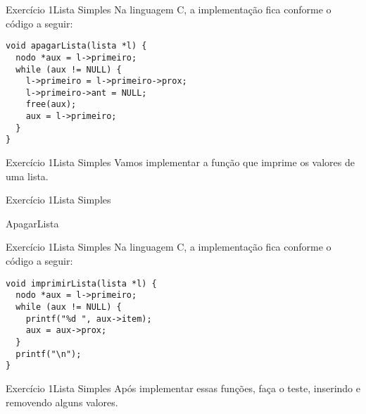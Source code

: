 \documentclass[aspectratio=169]{beamer}
\begin{document}
\begin{frame}[fragile]{Exercício 1}{Lista Simples}
Na linguagem C, a implementação fica conforme o código a seguir:
\begin{lstlisting}[style=CStyle]
void apagarLista(lista *l) {
  nodo *aux = l->primeiro;
  while (aux != NULL) {
    l->primeiro = l->primeiro->prox;
    l->primeiro->ant = NULL;
    free(aux);   
    aux = l->primeiro;
  }
}
\end{lstlisting}  
\end{frame}


\begin{frame}[fragile]{Exercício 1}{Lista Simples}
Vamos implementar a função que imprime os valores de uma lista.
\end{frame}


\begin{frame}[fragile]{Exercício 1}{Lista Simples}
\begin{algorithm}[H]
\caption{ApagarLista} 
\label{ApagarLista}
\end{algorithm}
\end{frame}


\begin{frame}[fragile]{Exercício 1}{Lista Simples}
Na linguagem C, a implementação fica conforme o código a seguir:
\begin{lstlisting}[style=CStyle]
void imprimirLista(lista *l) {
  nodo *aux = l->primeiro;
  while (aux != NULL) {
    printf("%d ", aux->item);
    aux = aux->prox;
  }
  printf("\n");
}
\end{lstlisting}  
\end{frame}


\begin{frame}[fragile]{Exercício 1}{Lista Simples}
Após implementar essas funções, faça o teste, inserindo e removendo alguns valores.
\end{frame}
\end{document}
